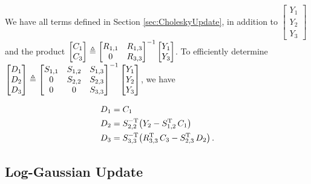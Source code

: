 \documentclass{acmtrans2m}
\begin{document}
\noindent We have all terms defined in Section \ref{sec:CholeskyUpdate}, in addition to $\begin{bmatrix} Y_1\\Y_2\\Y_3 \end{bmatrix}$ and the product $\begin{bmatrix} C_1\\C_3 \end{bmatrix}\triangleq\begin{bmatrix} R_{1,1} & R_{1,3} \\ 0 & R_{3,3} \end{bmatrix}^{-1} \begin{bmatrix} Y_1\\Y_3 \end{bmatrix}$. To efficiently determine $\begin{bmatrix} D_1\\D_2\\D_3 \end{bmatrix}\triangleq\begin{bmatrix} S_{1,1} & S_{1,2} & S_{1,3} \\ 0 & S_{2,2} & S_{2,3} \\ 0 & 0 & S_{3,3} \end{bmatrix}^{-1} \begin{bmatrix} Y_1\\Y_2\\Y_3 \end{bmatrix}$, we have

\begin{align}
 D_{1}&=C_{1}\\
D_{2} &=S_{2,2}^{-\mathrm{T}}\big(Y_2-S_{1,2}^{\mathrm{T}}\,C_1\big)\\
D_{3}&=S_{3,3}^{-\mathrm{T}}\big(R_{3,3}^{\mathrm{T}} \, C_3-S_{2,3}^{\mathrm{T}}\,D_2\big)\,.
\end{align}

\subsection{Log-Gaussian Update} \label{sec:LogGaussianUpdate}
\end{document}
